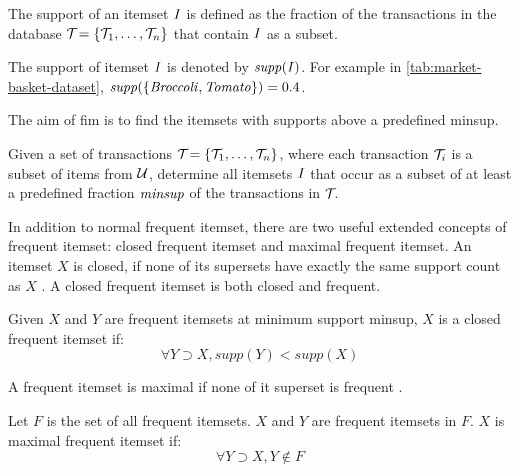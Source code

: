 \begin{definition}
    The support of an itemset $\mathit{I}$ is defined as the fraction of the transactions in the database $\mathcal{T}_{} = \{\mathcal{T}_{1}, \dots, \mathcal{T}_{n}\}{}$ that contain $\mathit{I}$ as a subset.
\end{definition}
\begin{sloppypar}
    The support of itemset $\mathit{I}$ is denoted by $\mathit{supp({I})}$.
    For example in \autoref{tab:market-basket-dataset}, $\mathit{supp({\{Broccoli, Tomato\}})} = 0.4$.
\end{sloppypar}
The aim of \acl{fim} is to find the itemsets with supports above a predefined \ac{minsup}.

\begin{definition}
    Given a set of transactions $\mathcal{T}_{} = \{\mathcal{T}_{1}, \dots, \mathcal{T}_{n}\}{}$, where each transaction $\mathcal{T}_{i}$ is a subset of items from $\mathcal{U}$, determine all itemsets $\mathit{I}$ that occur as a subset of at least a predefined fraction $\mathit{minsup}$ of the transactions in $\mathcal{T}_{}$.
\end{definition}

In addition to normal frequent itemset, there are two useful extended concepts of frequent itemset: closed frequent itemset and maximal frequent itemset.
An itemset $X$ is closed, if none of its supersets have exactly the same support count as $X$ \cite{Aggarwal15}.
A closed frequent itemset is both closed and frequent.
\begin{definition}
    Given $X$ and $Y$ are frequent itemsets at minimum support minsup, $X$ is a closed frequent itemset if:
    \begin{equation}
        \forall Y \supset X, supp(Y) < supp(X)
    \end{equation}
\end{definition}

A frequent itemset is maximal if none of it superset is frequent \cite{Aggarwal15}.

\begin{definition}
    Let $F$ is the set of all frequent itemsets. $X$ and $Y$ are frequent itemsets in $F$. $X$ is maximal frequent itemset if:
    \begin{equation}
        \forall Y \supset X, Y \notin F
    \end{equation}
\end{definition}

